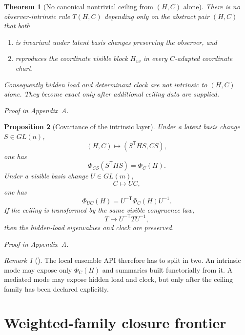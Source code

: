\documentclass[11pt,a4paper]{article}
\numberwithin{equation}{section}
\theoremstyle{thmcompact}
\newtheorem{theorem}{Theorem}[section]
\newtheorem{proposition}[theorem]{Proposition}
\theoremstyle{remark}
\newtheorem*{remarkplain}{Remark}
\newenvironment{remark}[1][]%
{\begin{remarkbox}\begin{remarkplain}[#1]\normalfont}
{\end{remarkplain}\end{remarkbox}}
\newcommand{\proofappendix}{\par{\hfill\scriptsize\emph{Proof in Appendix~A.}}\par}
\begin{document}
\begin{theorem}[No canonical nontrivial ceiling from $(H,C)$ alone]
\label{thm:no-canonical-ceiling}
There is no observer-intrinsic rule $T(H,C)$ depending only on the abstract pair $(H,C)$ that both
\begin{enumerate}
\item is invariant under latent basis changes preserving the observer, and
\item reproduces the coordinate visible block $H_{vv}$ in every $C$-adapted coordinate chart.
\end{enumerate}
Consequently hidden load and determinant clock are not intrinsic to $(H,C)$ alone. They become exact only after additional ceiling data are supplied.
\end{theorem}

\proofappendix

\begin{proposition}[Covariance of the intrinsic layer]
\label{prop:phi-covariance}
Under a latent basis change $S\in GL(n)$,
\begin{equation}
(H,C)\mapsto (S^{\mathsf T}HS,CS),
\end{equation}
one has
\begin{equation}
\Phi_{CS}(S^{\mathsf T}HS)=\Phi_C(H).
\end{equation}
Under a visible basis change $U\in GL(m)$,
\begin{equation}
C\mapsto UC,
\end{equation}
one has
\begin{equation}
\Phi_{UC}(H)=U^{-\mathsf T}\Phi_C(H)U^{-1}.
\end{equation}
If the ceiling is transformed by the same visible congruence law,
\begin{equation}
T\mapsto U^{-\mathsf T}TU^{-1},
\end{equation}
then the hidden-load eigenvalues and clock are preserved.
\end{proposition}

\proofappendix

\begin{remark}
The local ensemble API therefore has to split in two. An intrinsic mode may expose only $\Phi_C(H)$ and summaries built functorially from it. A mediated mode may expose hidden load and clock, but only after the ceiling family has been declared explicitly.
\end{remark}

\section{Weighted-family closure frontier}
\end{document}

